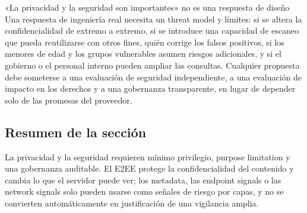 \begin{warningbox}{«La privacidad y la seguridad son importantes» no es una respuesta de diseño}
Una respuesta de ingeniería real necesita un threat model y límites: si se altera la confidencialidad de extremo a extremo, si se introduce una capacidad de escaneo que pueda reutilizarse con otros fines, quién corrige los falsos positivos, si los menores de edad y los grupos vulnerables asumen riesgos adicionales, y si el gobierno o el personal interno pueden ampliar las consultas. Cualquier propuesta debe someterse a una evaluación de seguridad independiente, a una evaluación de impacto en los derechos y a una gobernanza transparente, en lugar de depender solo de las promesas del proveedor.
\end{warningbox}


\subsection{Resumen de la sección}

La privacidad y la seguridad requieren mínimo privilegio, purpose limitation y una gobernanza auditable. El E2EE protege la confidencialidad del contenido y cambia lo que el servidor puede ver; los metadata, las endpoint signals o las network signals solo pueden usarse como señales de riesgo por capas, y no se convierten automáticamente en justificación de una vigilancia amplia.
